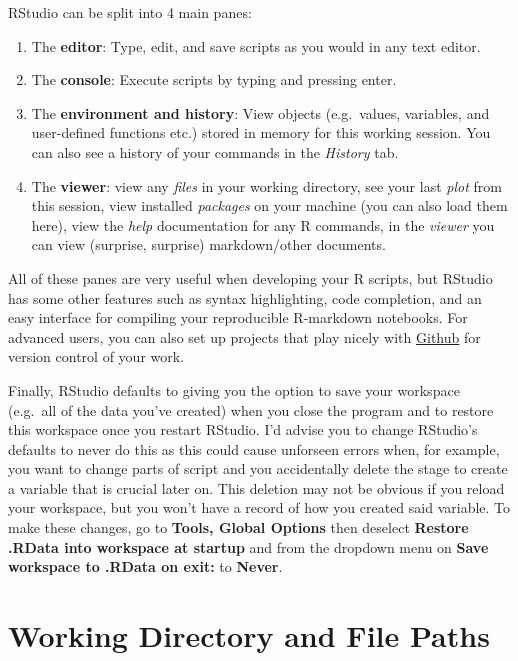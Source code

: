 \documentclass[
]{book}
\providecommand{\tightlist}{%
  \setlength{\itemsep}{0pt}\setlength{\parskip}{0pt}}
\begin{document}
RStudio can be split into 4 main panes:

\begin{enumerate}
\def\labelenumi{\arabic{enumi}.}
\tightlist
\item
  The {\textbf{editor}}: Type, edit, and save scripts as you would in any text editor.
\item
  The {\textbf{console}}: Execute scripts by typing and pressing enter.
\item
  The {\textbf{environment and history}}: View objects (e.g.~values, variables, and user-defined functions etc.) stored in memory for this working session. You can also see a history of your commands in the \emph{History} tab.
\item
  The {\textbf{viewer}}: view any \emph{files} in your working directory, see your last \emph{plot} from this session, view installed \emph{packages} on your machine (you can also load them here), view the \emph{help} documentation for any R commands, in the \emph{viewer} you can view (surprise, surprise) markdown/other documents.
\end{enumerate}

All of these panes are very useful when developing your R scripts, but RStudio has some other features such as syntax highlighting, code completion, and an easy interface for compiling your reproducible R-markdown notebooks. For advanced users, you can also set up projects that play nicely with \href{https://github.com/}{Github} for version control of your work.

Finally, RStudio defaults to giving you the option to save your workspace (e.g.~all of the data you've created) when you close the program and to restore this workspace once you restart RStudio. I'd advise you to change RStudio's defaults to never do this as this could cause unforseen errors when, for example, you want to change parts of script and you accidentally delete the stage to create a variable that is crucial later on. This deletion may not be obvious if you reload your workspace, but you won't have a record of how you created said variable. To make these changes, go to \textbf{Tools, Global Options} then deselect \textbf{Restore .RData into workspace at startup} and from the dropdown menu on \textbf{Save workspace to .RData on exit:} to \textbf{Never}.

\hypertarget{working-directory-and-file-paths}{%
\section{Working Directory and File Paths}\label{working-directory-and-file-paths}}
\end{document}
